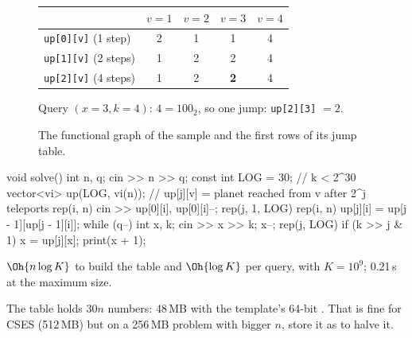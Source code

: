 \begin{figure}[H]
\centering
\begin{minipage}{0.34\linewidth}
\centering
{}
\end{minipage}\hfill
\begin{minipage}{0.62\linewidth}
\small
\begin{tabular}{@{}lcccc@{}}
\toprule
 & $v = 1$ & $v = 2$ & $v = 3$ & $v = 4$ \\
\midrule
\texttt{up[0][v]} (1 step) & 2 & 1 & 1 & 4 \\
\texttt{up[1][v]} (2 steps) & 1 & 2 & 2 & 4 \\
\texttt{up[2][v]} (4 steps) & 1 & 2 & \cellcolor{cporange!25}\textbf{2} & 4 \\
\bottomrule
\end{tabular}

\smallskip
{\footnotesize Query $(x = 3, k = 4)$: $4 = 100_2$, so one jump: \texttt{up[2][3]} $= 2$.}
\end{minipage}
\caption{The functional graph of the sample and the first rows of its jump table.}
\end{figure}

\begin{code}
void solve() {
    int n, q;
    cin >> n >> q;
    const int LOG = 30;  // k < 2^30
    vector<vi> up(LOG, vi(n));  // up[j][v] = planet reached from v after 2^j teleports
    rep(i, n) cin >> up[0][i], up[0][i]--;
    rep(j, 1, LOG) rep(i, n) up[j][i] = up[j - 1][up[j - 1][i]];
    while (q--) {
        int x, k;
        cin >> x >> k;
        x--;
        rep(j, LOG) if (k >> j & 1) x = up[j][x];
        print(x + 1);
    }
}
\end{code}

 $\Oh{n\log K}$ to build the table and $\Oh{\log K}$ per query, with $K = 10^9$; 0.21\,s at the maximum
size.

\begin{tip}[Memory]
The table holds $30n$ numbers: 48\,MB with the template's 64-bit . That is fine for CSES (512\,MB) but on a 256\,MB
problem with bigger $n$, store it as  to halve it.
\end{tip}

